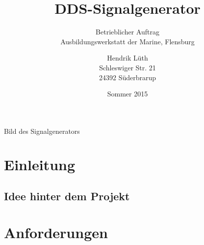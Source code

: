 \documentclass[12pt,a4paper]{scrartcl}
\title{DDS-Signalgenerator}
\subtitle{Betrieblicher Auftrag\\Ausbildungswerkstatt der Marine, Flensburg}
\author{Hendrik Lüth\\Schleswiger Str. 21\\24392 Süderbrarup}
\date{Sommer 2015}
\begin{document}
 \maketitle
\begin{center}
Bild des Signalgenerators
\end{center}
\pagebreak
 \tableofcontents
\pagebreak
\section{Einleitung}
\subsection{Idee hinter dem Projekt}



\section{Anforderungen}
\end{document}
